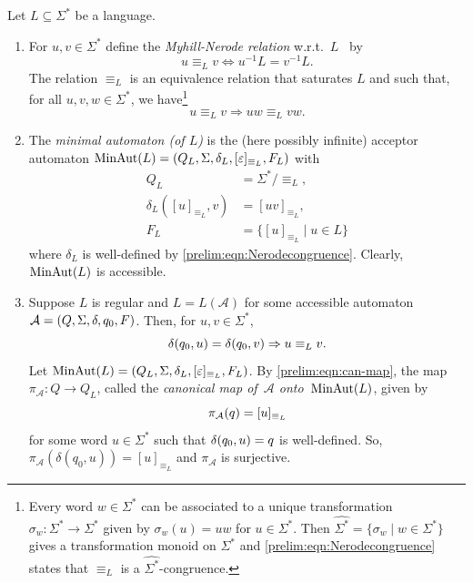 Let $L \subseteq \Sigma^*$ be a language.
\begin{enumerate}
\item  For $u,v \in \Sigma^*$ define the 
\emph{Myhill-Nerode relation} w.r.t.~$L$~\cite{myhill1957finite,nerode1958linear} by 
\[ 
u \equiv_L v
\Leftrightarrow 
u^{-1}L = v^{-1}L.
\]
The relation $\equiv_L$ is an equivalence relation that saturates $L$ and such that, for all
$u,v,w \in \Sigma^*$, we have\footnote{Every word $w \in \Sigma^*$
	can be associated to a unique transformation ${\sigma}_w \colon \Sigma^* \to \Sigma^*$
	given by $\sigma_w(u) = uw$ for $u \in \Sigma^*$.
	Then $\hat{\Sigma^*} = \{ {\sigma}_w \mid w \in \Sigma^* \}$
	gives a transformation monoid on $\Sigma^*$
	and \cref{prelim:eqn:Nerodecongruence} 
	states that $\equiv_L$ is a $\hat{\Sigma^*}$-congruence.
} 
\begin{equation}\label{prelim:eqn:Nerodecongruence}
	u \equiv_L v \Rightarrow uw \equiv_L vw.
\end{equation}

\label{def:minaut}

\item The \emph{minimal automaton (of $L$)} is the
(here possibly infinite) acceptor automaton 
$\minaut{L} = (Q_L, \Sigma, \delta_L, [\varepsilon]_{\equiv_L}, F_L)$
with 
\begin{align*}
	Q_L & = \Sigma^* / {\equiv_L}, \\
	\delta_L([u]_{\equiv_L}, v) & = [uv]_{\equiv_L}, \\
	F_L & = \{ [u]_{\equiv_L} \mid u \in L \}
\end{align*}
where $\delta_L$ is well-defined by \cref{prelim:eqn:Nerodecongruence}.
Clearly, $\minaut{L}$ is accessible.

\label{def:Nerode-morphism}

\item Suppose $L$ is regular
 and $L = L(\mathcal A)$ for some accessible automaton $\automat{A}{Q}{\Sigma}{\delta}{q_0}{F}$.
 Then, for $u,v \in \Sigma^*$,
 \begin{equation}\label{prelim:eqn:can-map}
 	\applytrans{\delta}{q_0}{u} = \applytrans{\delta}{q_0}{v}
 	\Rightarrow
 	u \equiv_L v.
 \end{equation} 
 Let $\minaut{L} = (Q_L, \Sigma, \delta_L, [\varepsilon]_{\equiv_L}, F_L)$.
 By \cref{prelim:eqn:can-map}, the map $\pi_{\mathcal A} \colon Q \to Q_L$, called the \emph{canonical map of~$\mathcal A$ onto~$\minaut{L}$},
 given by \[ 
 \applyfunc{q}{\pi_{\mathcal A}} = [u]_{\equiv_L}
 \]
 for some word $u \in \Sigma^*$ such that $\applytrans{\delta}{q_0}{u} = q$
 is well-defined.
 So, $\pi_{\mathcal A}(\delta(q_0, u)) = [u]_{\equiv_L}$
 and $\pi_{\mathcal A}$ is surjective.
  

\end{enumerate}
